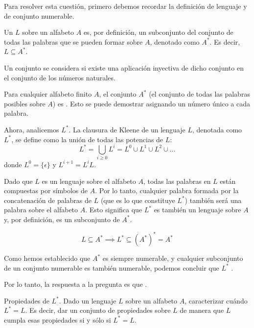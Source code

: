 \documentclass[12pt]{book} %
\begin{document}
\begin{solucion}
Para resolver esta cuestión, primero debemos recordar la definición de lenguaje y de conjunto numerable.

Un  $L$ sobre un alfabeto $A$ es, por definición, un subconjunto del conjunto de todas las palabras que se pueden formar sobre $A$, denotado como $A^*$. Es decir, $L \subseteq A^*$.

Un conjunto se considera  si existe una aplicación inyectiva de dicho conjunto en el conjunto de los números naturales.

Para cualquier alfabeto finito $A$, el conjunto $A^*$ (el conjunto de todas las palabras posibles sobre $A$) es . Esto se puede demostrar asignando un número único a cada palabra.

Ahora, analicemos $L^*$. La clausura de Kleene de un lenguaje $L$, denotada como $L^*$, se define como la unión de todas las potencias de $L$:
\[ L^* = \bigcup_{i \geq 0} L^i = L^0 \cup L^1 \cup L^2 \cup \dots \]
donde $L^0 = \{\epsilon\}$ y $L^{i+1} = L^iL$.

Dado que $L$ es un lenguaje sobre el alfabeto $A$, todas las palabras en $L$ están compuestas por símbolos de $A$. Por lo tanto, cualquier palabra formada por la concatenación de palabras de $L$ (que es lo que constituye $L^*$) también será una palabra sobre el alfabeto $A$. Esto significa que $L^*$ es también un lenguaje sobre $A$ y, por definición, es un subconjunto de $A^*$.

\[ L \subseteq A^* \implies L^* \subseteq (A^*)^* = A^* \]

Como hemos establecido que $A^*$ es siempre numerable, y cualquier subconjunto de un conjunto numerable es también numerable, podemos concluir que $L^*$ .

Por lo tanto, la respuesta a la pregunta es que .
\end{solucion}

\begin{ejercicio}
Propiedades de $L^*$. Dado un lenguaje $L$ sobre un alfabeto $A$, caracterizar cuándo $L^* = L$. Es decir, dar un conjunto de propiedades sobre $L$ de manera que $L$ cumpla esas propiedades si y sólo si $L^* = L$.
\end{ejercicio}
\end{document}
